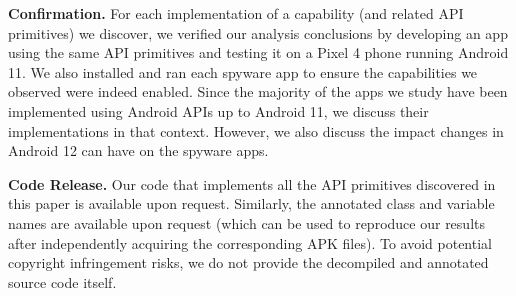 \textbf{Confirmation.} For each implementation of a capability (and
related API primitives) we discover, we verified our analysis conclusions
by developing an app using the same API primitives and
testing it on a Pixel 4 phone running Android 11. We also installed and ran each spyware app to ensure the capabilities we observed were indeed enabled.
Since the majority of the apps we
study have been implemented using Android APIs up to Android 11, we
discuss their implementations in that context. However, we also
discuss the impact changes in Android 12 can have on the spyware apps.

\textbf{Code Release.}  Our code that implements all the API
primitives discovered in this paper is available upon
request. Similarly, the annotated class and variable names are
available upon request (which can be used to reproduce our results
after independently acquiring the corresponding APK files). To avoid
potential copyright infringement risks, we do not provide the
decompiled and annotated source code itself.






